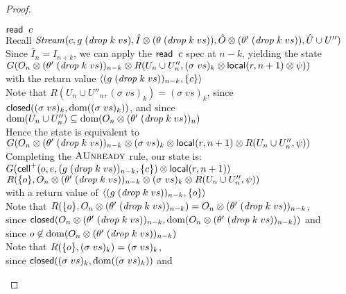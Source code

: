 \begin{proof}
\begin{enumerate}
\begin{tabbedproof}
  \ooooo $\mathsf{read}\;\;c$ \\
  \oooo Recall $\mathit{Stream}(c, g\;(\mathit{drop}\;k\;vs), \hat{I} \otimes (\theta\;(\mathit{drop}\;k\;vs)), \hat{O} \otimes (\theta'\;(\mathit{drop}\;k\;vs)), \hat{U} \cup U'')$ \\
  \oooo Since $\hat{I}_n = I_{n+k}$, we can apply the $\mathsf{read}\;\;c$ spec at $n - k$, yielding the state \\
  \ooooo $G(O_n \otimes (\theta'\;(\mathit{drop}\;k\;vs))_{n-k} \otimes R(U_n \cup U''_n, (\sigma\;vs)_k\otimes \mathsf{local}({r}, {n+1}) \otimes \psi))$ \\ 
  \oooo with the return value $\left<{(g\;(\mathit{drop}\;k\;vs))_{n-k}},{\{{c}\}}\right>$ \\
  \oooo Note that $R(U_n \cup U''_n, (\sigma\;vs)_k) = (\sigma\;vs)_k$, since \\
  \ooooo $\mathsf{closed}({(\sigma\;vs)_k}, {\mbox{dom}({(\sigma\;vs)_k})})$, and since \\
  \ooooo $\mbox{dom}({U_n \cup U''_n}) \subseteq \mbox{dom}({O_n \otimes (\theta'\;(\mathit{drop}\;k\;vs))_n})$ \\ 
  \oooo Hence the state is equivalent to \\
  \ooooo $G(O_n \otimes (\theta'\;(\mathit{drop}\;k\;vs))_{n-k} \otimes (\sigma\;vs)_k\otimes \mathsf{local}({r}, {n+1}) \otimes R(U_n \cup U''_n, \psi))$ \\ 
  \oooo Completing the $\textsc{AUnready}$ rule, our state is: \\
  \ooooo $G(\mathsf{cell}^{+}({o}, {e}, {(g\;(\mathit{drop}\;k\;vs))_{n-k}}, {\{{c}\}}) \otimes \mathsf{local}({r}, {n+1}))$ \\
  \oooooo $R(\{{o}\}, O_n \otimes (\theta'\;(\mathit{drop}\;k\;vs))_{n-k} \otimes (\sigma\;vs)_k \otimes R(U_n \cup U''_n, \psi))$ \\ 
  \oooo with a return value of $\left<{(g\;(\mathit{drop}\;k\;vs))_{n-k}},{\{{o}\}}\right>$ \\
  \oooo Note that $R(\{{o}\}, O_n \otimes (\theta'\;(\mathit{drop}\;k\;vs))_{n-k}) = O_n \otimes (\theta'\;(\mathit{drop}\;k\;vs))_{n-k}$, \\
  \ooooo since $\mathsf{closed}({O_n \otimes (\theta'\;(\mathit{drop}\;k\;vs))_{n-k}}, {\mbox{dom}({O_n \otimes (\theta'\;(\mathit{drop}\;k\;vs))_{n-k}})})$ and \\
  \ooooo since $o \not\in \mbox{dom}({O_n \otimes (\theta'\;(\mathit{drop}\;k\;vs))_{n-k}})$ \\
  \oooo Note that $R(\{{o}\}, (\sigma\;vs)_k) = (\sigma\;vs)_k$, \\
  \ooooo since $\mathsf{closed}({(\sigma\;vs)_k}, {\mbox{dom}({(\sigma\;vs)_k})})$ and \\

\end{tabbedproof}
\end{enumerate}
\end{proof}

